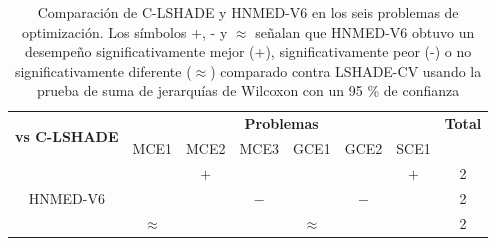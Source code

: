 \begin{table}
	\centering
	\caption[Comparación de C-LSHADE y HNMED-V6 en los seis problemas de optimización mediante la prueba de Suma de jerarquías de Wilcoxon]{Comparación de C-LSHADE y HNMED-V6 en los seis problemas de optimización. Los símbolos +, - y $\approx$ señalan que HNMED-V6 obtuvo un desempeño significativamente mejor (+), significativamente peor (-) o no significativamente diferente ($\approx$) comparado contra LSHADE-CV usando la prueba de suma de jerarquías de Wilcoxon con un 95 \% de confianza} \label{tab:Wilcoxon HNMED-V6-CLSHADE}
	\begin{tabular}{cccccccc}
		\multirow{2}{*}{\textbf{vs C-LSHADE}} & \multicolumn{6}{c}{\textbf{Problemas}}           & \textbf{Total}  \\
	                                        	& MCE1 & MCE2 & MCE3 & GCE1 & GCE2 & SCE1 &        \\
		\hline
		\multirow{3}{*}{HNMED-V6}    &      &  $+$    &      &      &      &  $+$    &   2     \\
		&      &      & $-$     &      &    $-$  &      &    2    \\
		&$\approx$&   &         &$\approx$&      &       &  2     
	\end{tabular}
\end{table}

